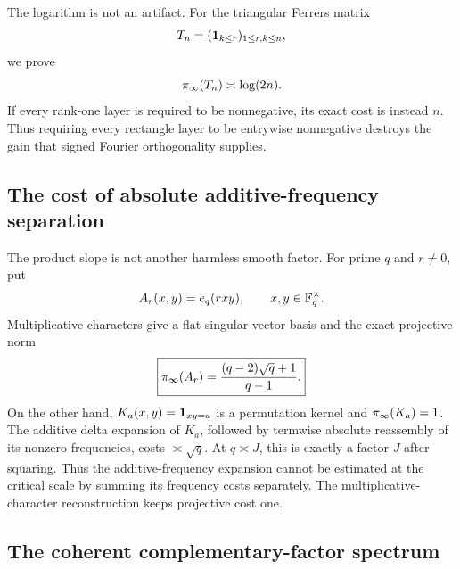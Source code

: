 The logarithm is not an artifact.  For the triangular Ferrers matrix
\begin{equation}
 T_n=(\mathbf 1_{k\le r})_{1\le r,k\le n},
 \label{eq:tpc36-triangular-intro}
\end{equation}
we prove
\begin{equation}
 \pi_{\infty}(T_n)\asymp\log(2n).
 \label{eq:tpc36-ferrers-optimal-intro}
\end{equation}
If every rank-one layer is required to be nonnegative, its exact cost is
instead \(n\).  Thus requiring every rectangle layer to be entrywise
nonnegative destroys the gain that signed Fourier orthogonality supplies.

\subsection{The cost of absolute additive-frequency separation}

The product slope is not another harmless smooth factor.  For prime \(q\)
and \(r\ne0\), put
\begin{equation}
 A_r(x,y)=e_q(rxy),\qquad x,y\in\mathbb F_q^\times.
 \label{eq:tpc36-product-phase-intro}
\end{equation}
Multiplicative characters give a flat singular-vector basis and the exact
projective norm
\begin{equation}
 \boxed{
 \pi_{\infty}(A_r)=\frac{(q-2)\sqrt q+1}{q-1}.}
 \label{eq:tpc36-product-phase-cost-intro}
\end{equation}
On the other hand, \(K_a(x,y)=\mathbf 1_{xy=a}\) is a permutation kernel and
\(\pi_{\infty}(K_a)=1\).  The additive delta expansion of \(K_a\), followed by
termwise absolute reassembly of its nonzero frequencies, costs
\(\asymp\sqrt q\).  At \(q\asymp J\), this is exactly a factor \(J\) after
squaring.  Thus the additive-frequency expansion cannot be estimated at
the critical scale by summing its frequency costs separately.  The
multiplicative-character reconstruction keeps projective cost one.

\subsection{The coherent complementary-factor spectrum}


